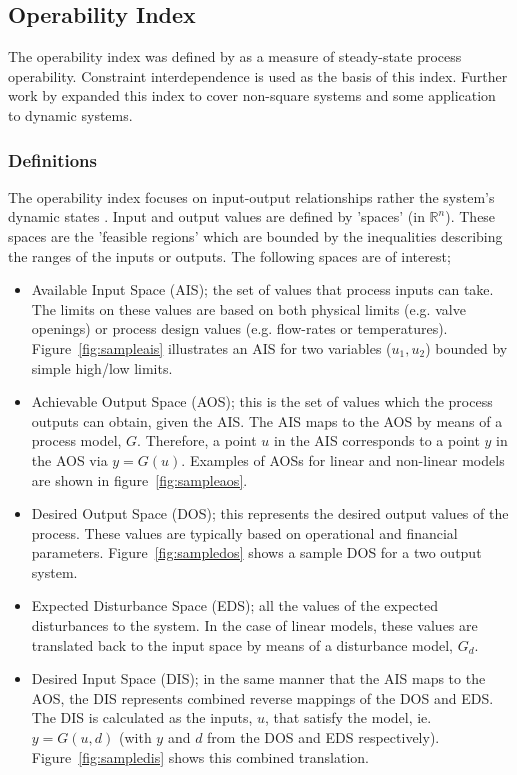\subsection{Operability Index}\label{sec:oi}
The operability index was defined by \citet{vinsonphd} as a measure of steady-state process operability. 
Constraint interdependence is used as the basis of this index. 
Further work by \citet{limaphd} expanded this index to cover non-square systems and some application to dynamic systems.
\subsubsection{Definitions}
The operability index focuses on input-output relationships rather the system's dynamic states \citep{vinsonphd}. 
Input and output values are defined by 'spaces' (in $\mathbb{R}^n$). 
These spaces are the 'feasible regions' which are bounded by the inequalities describing the ranges of the inputs or outputs. 
The following spaces are of interest;
\begin{itemize}
  \item Available Input Space (AIS); the set of values that process      inputs can take. 
    The limits on these values are based on both physical limits (e.g.     valve openings) or process design values (e.g. flow-rates or temperatures). 
Figure~\ref{fig:sampleais} illustrates an AIS for two variables ($u_1, u_2$) bounded by simple high/low limits.
  \item Achievable Output Space (AOS); this is the set of values which the process outputs can obtain, given the AIS. 
The AIS maps to the AOS by means of a process model, $G$. 
Therefore, a point $u$ in the AIS corresponds to a point $y$ in the AOS via $y=G(u)$. 
Examples of AOSs for linear and non-linear models are shown in figure~\ref{fig:sampleaos}.
  \item Desired Output Space (DOS); this represents the desired output values of the process. 
These values are typically based on operational and financial   parameters. 
Figure~\ref{fig:sampledos} shows a sample DOS for a two output    system.
  \item Expected Disturbance Space (EDS); all the values of the expected disturbances to the system. 
In the case of linear models, these values are translated back to the input space by means of a disturbance model, $G_d$.
  \item Desired Input Space (DIS); in the same manner that the AIS maps to the AOS, the DIS represents combined reverse mappings of the DOS and EDS.
The DIS is calculated as the inputs, $u$, that satisfy the model, ie. $y=G(u,d)$ (with $y$ and $d$ from the DOS and EDS respectively).
Figure~\ref{fig:sampledis} shows this combined translation.
\end{itemize}

